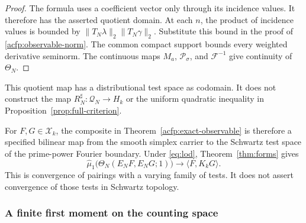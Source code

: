 \begin{proof}
The formula uses a coefficient vector only through its incidence values.
It therefore has the asserted quotient domain.
At each $n$, the product of incidence values is bounded by
$\|T_N\lambda\|_2\|T_N\gamma\|_2$.
Substitute this bound in the proof of \eqref{acfp:observable-norm}.
The common compact support bounds every weighted derivative seminorm.
The continuous maps $M_a$, $\mathcal P_\sigma$, and $\mathcal F^{-1}$
give continuity of $\Theta_N$.
\end{proof}

This quotient map has a distributional test space as codomain.
It does not construct the map $R_N^\sharp:\mathcal Q_N\to H_k$
or the uniform quadratic inequality in Proposition~\ref{prop:full-criterion}.

For $F,G\in\mathcal X_k$, the composite in Theorem~\ref{acfp:exact-observable}
is therefore a specified bilinear map from the smooth simplex carrier
to the Schwartz test space of the prime-power Fourier boundary.
Under \eqref{eq:lod}, Theorem~\ref{thm:forms} gives
\begin{equation}\label{acfp:conditional-limit}
 \widehat\mu_1\bigl(\Theta_N(E_NF,E_NG;1)\bigr)
       \longrightarrow\langle F,K_kG\rangle.
\end{equation}
This is convergence of pairings with a varying family of tests.
It does not assert convergence of those tests in Schwartz topology.

\subsubsection{A finite first moment on the counting space}

